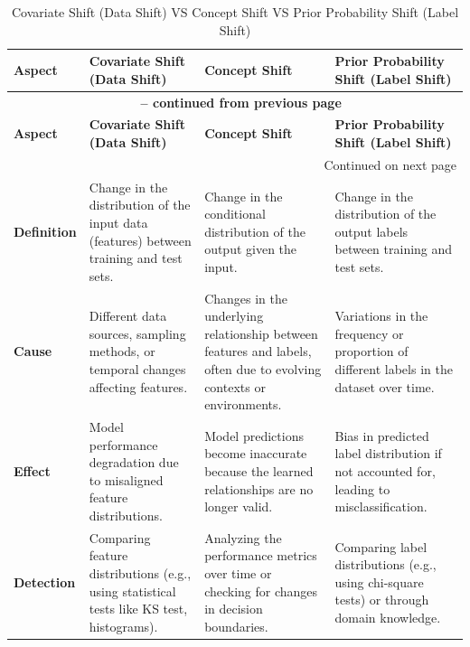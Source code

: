 \begin{longtable}{|m{3.5cm}|m{4cm}|m{4cm}|m{4cm}|}
    \caption{Covariate Shift (Data Shift) VS Concept Shift VS Prior Probability Shift (Label Shift)} \\ \hline
    
    \textbf{Aspect} & \textbf{Covariate Shift (Data Shift)} & \textbf{Concept Shift} & \textbf{Prior Probability Shift (Label Shift)} \\ \hline
    \endfirsthead
    
    \multicolumn{4}{c}{{\bfseries \tablename\ \thetable{} -- continued from previous page}} \\ \hline
    \textbf{Aspect} & \textbf{Covariate Shift (Data Shift)} & \textbf{Concept Shift} & \textbf{Prior Probability Shift (Label Shift)} \\ \hline
    \endhead
    
    \hline \multicolumn{4}{r}{{Continued on next page}} \\ \hline
    \endfoot
    
    \hline
    \endlastfoot
    
    \textbf{Definition} & Change in the distribution of the input data (features) between training and test sets. & Change in the conditional distribution of the output given the input. & Change in the distribution of the output labels between training and test sets. \\ \hline
    
    \textbf{Cause} & Different data sources, sampling methods, or temporal changes affecting features. & Changes in the underlying relationship between features and labels, often due to evolving contexts or environments. & Variations in the frequency or proportion of different labels in the dataset over time. \\ \hline

    \textbf{Effect} & Model performance degradation due to misaligned feature distributions. & Model predictions become inaccurate because the learned relationships are no longer valid. & Bias in predicted label distribution if not accounted for, leading to misclassification. \\ \hline

    \textbf{Detection} & Comparing feature distributions (e.g., using statistical tests like KS test, histograms). & Analyzing the performance metrics over time or checking for changes in decision boundaries. & Comparing label distributions (e.g., using chi-square tests) or through domain knowledge. \\ \hline


\end{longtable}
